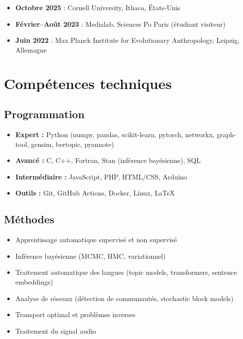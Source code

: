 \documentclass[11pt,a4paper]{article}
\begin{document}
\begin{itemize}
    \item \textbf{Octobre 2025} : Cornell University, Ithaca, États-Unis
    \item \textbf{Février--Août 2023} : Medialab, Sciences Po Paris (étudiant visiteur)
    \item \textbf{Juin 2022} : Max Planck Institute for Evolutionary Anthropology, Leipzig, Allemagne
\end{itemize}


\section{Compétences techniques}

\subsection{Programmation}

\begin{itemize}
    \item \textbf{Expert :} Python (numpy, pandas, scikit-learn, pytorch, networkx, graph-tool, gensim, bertopic, pyannote)
    \item \textbf{Avancé :} C, C++, Fortran, Stan (inférence bayésienne), SQL
    \item \textbf{Intermédiaire :} JavaScript, PHP, HTML/CSS, Arduino
    \item \textbf{Outils :} Git, GitHub Actions, Docker, Linux, LaTeX
\end{itemize}

\subsection{Méthodes}

\begin{itemize}
    \item Apprentissage automatique supervisé et non supervisé
    \item Inférence bayésienne (MCMC, HMC, variationnel)
    \item Traitement automatique des langues (topic models, transformers, sentence embeddings)
    \item Analyse de réseaux (détection de communautés, stochastic block models)
    \item Transport optimal et problèmes inverses
    \item Traitement du signal audio
\end{itemize}
\end{document}
